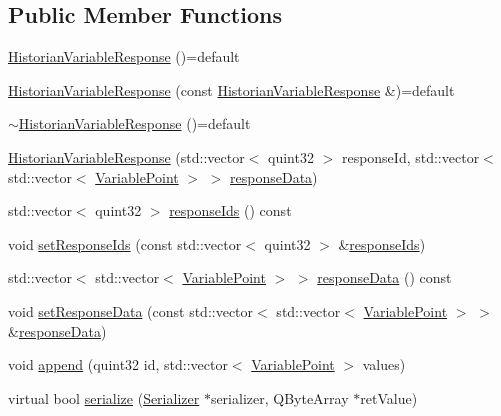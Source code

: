 \subsection*{Public Member Functions}
\begin{DoxyCompactItemize}
\item 
\hyperlink{class_a_h_p_1_1_historian_variable_response_aed9daf11e265842d0a7715bbe4b4cb27}{Historian\+Variable\+Response} ()=default
\item 
\hyperlink{class_a_h_p_1_1_historian_variable_response_a6ceae8c7d65b77e03171cecd3862ff53}{Historian\+Variable\+Response} (const \hyperlink{class_a_h_p_1_1_historian_variable_response}{Historian\+Variable\+Response} \&)=default
\item 
\hyperlink{class_a_h_p_1_1_historian_variable_response_ab6837bd382675ae5f1d0f7b8b97a4b59}{$\sim$\+Historian\+Variable\+Response} ()=default
\item 
\hyperlink{class_a_h_p_1_1_historian_variable_response_a4a4968de1663831492b4ad452a7bbed7}{Historian\+Variable\+Response} (std\+::vector$<$ quint32 $>$ response\+Id, std\+::vector$<$ std\+::vector$<$ \hyperlink{class_variable_point}{Variable\+Point} $>$ $>$ \hyperlink{class_a_h_p_1_1_historian_variable_response_afd9c2b8693cc6fc3965dbcbbc897b012}{response\+Data})
\item 
std\+::vector$<$ quint32 $>$ \hyperlink{class_a_h_p_1_1_historian_variable_response_afd5c82951113b8f7e5448e6b6d016a31}{response\+Ids} () const 
\item 
void \hyperlink{class_a_h_p_1_1_historian_variable_response_aa988a4efe704c0038ff1c317b7e1e316}{set\+Response\+Ids} (const std\+::vector$<$ quint32 $>$ \&\hyperlink{class_a_h_p_1_1_historian_variable_response_afd5c82951113b8f7e5448e6b6d016a31}{response\+Ids})
\item 
std\+::vector$<$ std\+::vector$<$ \hyperlink{class_variable_point}{Variable\+Point} $>$ $>$ \hyperlink{class_a_h_p_1_1_historian_variable_response_afd9c2b8693cc6fc3965dbcbbc897b012}{response\+Data} () const 
\item 
void \hyperlink{class_a_h_p_1_1_historian_variable_response_ad142474b00b148819cb21f2e3d4bbb93}{set\+Response\+Data} (const std\+::vector$<$ std\+::vector$<$ \hyperlink{class_variable_point}{Variable\+Point} $>$ $>$ \&\hyperlink{class_a_h_p_1_1_historian_variable_response_afd9c2b8693cc6fc3965dbcbbc897b012}{response\+Data})
\item 
void \hyperlink{class_a_h_p_1_1_historian_variable_response_ac1245e7dc4eaaa6161bd440fc1fc156d}{append} (quint32 id, std\+::vector$<$ \hyperlink{class_variable_point}{Variable\+Point} $>$ values)
\item 
virtual bool \hyperlink{class_a_h_p_1_1_historian_variable_response_a62235a38a657b98da309c2c6fa0abdb5}{serialize} (\hyperlink{class_serializer}{Serializer} $\ast$serializer, Q\+Byte\+Array $\ast$ret\+Value)
\end{DoxyCompactItemize}

